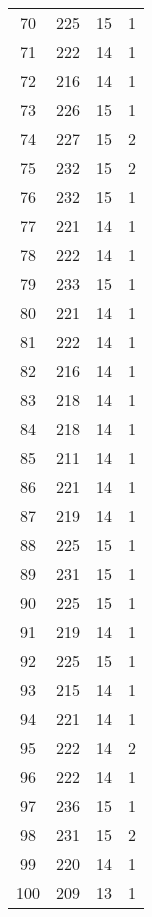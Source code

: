 \begin{longtable}[!]{c|ccc}
	70	& 225	& 15	& 1	\\
	71	& 222	& 14	& 1	\\
	72	& 216	& 14	& 1	\\
	73	& 226	& 15	& 1	\\
	74	& 227	& 15	& 2	\\
	75	& 232	& 15	& 2	\\
	76	& 232	& 15	& 1	\\
	77	& 221	& 14	& 1	\\
	78	& 222	& 14	& 1	\\
	79	& 233	& 15	& 1	\\
	80	& 221	& 14	& 1	\\
	81	& 222	& 14	& 1	\\
	82	& 216	& 14	& 1	\\
	83	& 218	& 14	& 1	\\
	84	& 218	& 14	& 1	\\
	85	& 211	& 14	& 1	\\
	86	& 221	& 14	& 1	\\
	87	& 219	& 14	& 1	\\
	88	& 225	& 15	& 1	\\
	89	& 231	& 15	& 1	\\
	90	& 225	& 15	& 1	\\
	91	& 219	& 14	& 1	\\
	92	& 225	& 15	& 1	\\
	93	& 215	& 14	& 1	\\
	94	& 221	& 14	& 1	\\
	95	& 222	& 14	& 2	\\
	96	& 222	& 14	& 1	\\
	97	& 236	& 15	& 1	\\
	98	& 231	& 15	& 2	\\
	99	& 220	& 14	& 1	\\
	100	& 209	& 13	& 1	\\
\end{longtable}


